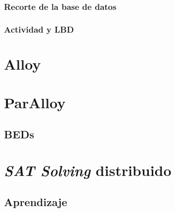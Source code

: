 \subsubsection{Recorte de la base de datos}
\subsubsection{Actividad y LBD}

\section{Alloy}

\section{ParAlloy}
\subsection{BEDs}

\section{\emph{SAT Solving} distribuido}

\subsection{Aprendizaje}
